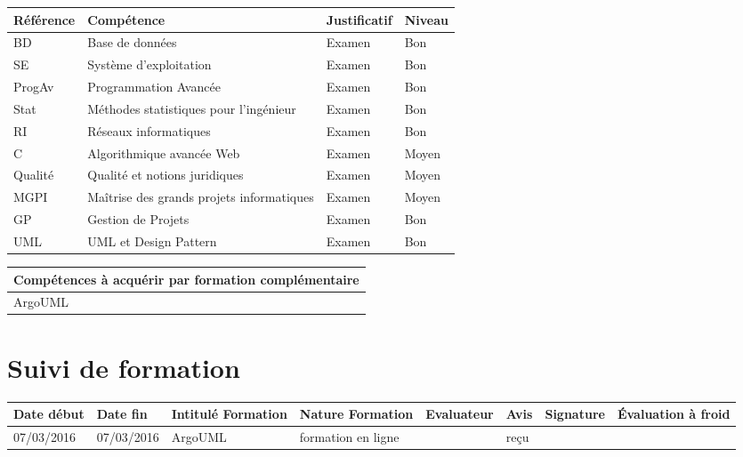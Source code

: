 \documentclass[11pt]{article}
\begin{document}
\centering
	\begin{longtable}{|p{}|p{}|p{}|p{}|}
	\hline
	\rowcolor{gray!40} Référence & Compétence & Justificatif & Niveau \\
	\hline
	 BD & Base de données & Examen & Bon \\
	 \hline
	  SE & Système d'exploitation & Examen & Bon\\
	  \hline
	  ProgAv & Programmation Avancée & Examen & Bon\\
	  \hline
	  Stat & Méthodes statistiques pour l'ingénieur & Examen & Bon \\ 
	  \hline
	  RI & Réseaux informatiques & Examen & Bon \\
	  \hline
	  C & Algorithmique avancée Web & Examen & Moyen \\
	  \hline
	  Qualité & Qualité et notions juridiques & Examen & Moyen \\
	  \hline
	  MGPI & Maîtrise des grands projets informatiques & Examen & Moyen \\
	  \hline
	  GP & Gestion de Projets & Examen & Bon \\
	  \hline
	  UML & UML et Design Pattern & Examen & Bon \\
	  \hline
	\end{longtable}

\centering
	\begin{longtable}{|p{}|}
	\hline
	\rowcolor{gray!40} Compétences à acquérir par formation complémentaire \\
	\hline
	 ArgoUML \\
	\hline
	\end{longtable}

\section*{\large Suivi de formation}

\centering

	\begin{longtable}{|p{}|p{}|p{}|p{}|p{}|p{}|p{}|p{}|}
	
	\hline
	\rowcolor{gray!40} \tiny Date début & \tiny Date fin & \tiny Intitulé Formation & \tiny Nature Formation & \tiny Evaluateur & \tiny Avis & \tiny Signature & \tiny Évaluation à froid \\
	\hline
	07/03/2016 &07/03/2016 &ArgoUML &formation en ligne &\Julie &reçu & & \\
	\hline
	\end{longtable}
\end{document}
